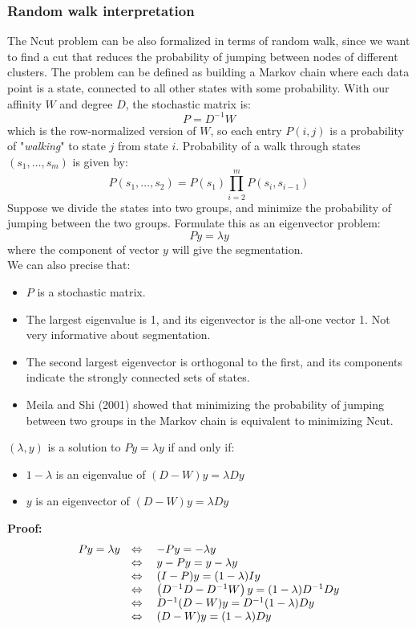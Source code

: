 \subsubsection{Random walk interpretation} 
The Ncut problem can be also formalized in terms of random walk, since we want to find a cut that reduces the probability of jumping between nodes of different clusters. The problem can be defined as building a Markov chain where each data point is a state, connected to all other states with some probability. With our affinity $W$ and degree $D$, the stochastic matrix is:
$$P=D^{-1}W$$
which is the row-normalized version of $W$, so each entry $P(i,j)$ is a probability of "\textit{walking}" to state $j$ from state $i$.
Probability of a walk through states $( s _ { 1 } , \dots , s _ { m })$ is given by:
$$P \left( s _ { 1 } , \ldots , s _ { 2 } \right) = P \left( s _ { 1 } \right) \prod _ { i = 2 } ^ { m } P \left( s _ { i } , s _ { i - 1 } \right)$$
Suppose we divide the states into two groups, and minimize the probability of jumping between the two groups. Formulate this as an eigenvector problem:
$$P y = \lambda y$$
where the component of vector $y$ will give the segmentation.\\
We can also precise that:
\begin{itemize}
	\item $P$ is a stochastic matrix.
	\item The largest eigenvalue is 1, and its eigenvector is the all-one vector 1. Not very informative about segmentation.
	\item The second largest eigenvector is orthogonal to the first, and its components indicate the strongly connected sets of states.
	\item Meila and Shi (2001) showed that minimizing the probability of jumping between two groups in the Markov chain is equivalent to minimizing Ncut.
\end{itemize}
\begin{thm} $(\lambda, y)$ is a solution to $Py = \lambda y$ if and only if:
	\begin{itemize}
		\item $1-\lambda$ is an eigenvalue of $(D-W)y = \lambda D y$
		\item $y$ is an eigenvector of $(D-W)y = \lambda Dy$
	\end{itemize} 
	\textbf{Proof:}
	$$\begin{array} { l l } { P y = \lambda y } & { \Leftrightarrow \quad - P y = - \lambda y } \\
	 { } & { \Leftrightarrow \quad y - P y = y - \lambda y } \\
	 { } & { \Leftrightarrow \quad ( I - P ) y = ( 1 - \lambda ) I y } \\
	 { } & { \Leftrightarrow \quad \left( D ^ { - 1 } D - D ^ { - 1 } W \right) y = ( 1 - \lambda ) D ^ { - 1 } D y } \\
	 { } & { \Leftrightarrow \quad D ^ { - 1 } ( D - W ) y = D ^ { - 1 } ( 1 - \lambda ) D y } \\
	 { } & { \Leftrightarrow \quad ( D - W ) y = ( 1 - \lambda ) D y } \end{array}$$
\end{thm}
